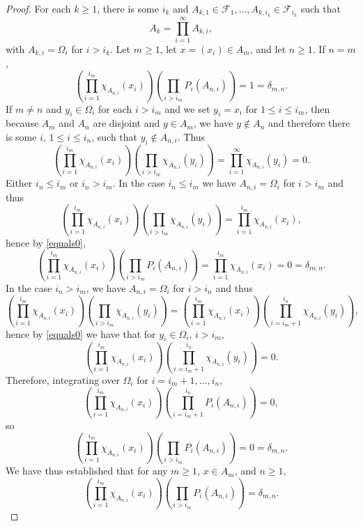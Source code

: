 \documentclass{article}
\theoremstyle{definition}
\theoremstyle{definition}
\begin{document}
\begin{proof}
For each $k \geq 1$, there is some $i_k$ and $A_{k,1} \in \mathscr{F}_1, \ldots,A_{k,i_k} \in \mathscr{F}_{i_k}$ such that
\[
A_k = \prod_{i=1}^\infty A_{k,i},
\]
with $A_{k,i}=\Omega_i$ for $i>i_k$. 
Let $m \geq 1$, let $x=(x_i) \in A_m$, and let $n \geq 1$. If $n=m$,  
\[
\left( \prod_{i=1}^{i_m} \chi_{A_{n,i}}(x_i) \right) \left( \prod_{i>i_m} P_i(A_{n,i}) \right) 
=1=\delta_{m,n}.
\]
If $m \neq n$ and $y_i \in \Omega_i$ for each $i>i_m$ and we set
$y_i=x_i$ for $1 \leq i \leq i_m$,
then  because $A_m$ and $A_n$ are disjoint and $y \in A_m$,
we have $y \not \in A_n$ and therefore there is some $i$,
$1 \leq i \leq i_n$, such that $y_i \not \in A_{n,i}$. 
Thus
\begin{equation}
\left( \prod_{i=1}^{i_m} \chi_{A_{n,i}}(x_i) \right) \left( \prod_{i>i_m} \chi_{A_{n,i}}(y_i) \right) = 
\prod_{i=1}^\infty \chi_{A_{n,i}}(y_i) = 0.
\label{equals0}
\end{equation}
Either $i_n \leq i_m$ or $i_n>i_m$. In the case $i_n \leq i_m$ we have
$A_{n,i} = \Omega_i$ for $i > i_m$ and thus
\[
\left( \prod_{i=1}^{i_m} \chi_{A_{n,i}}(x_i) \right) \left( \prod_{i>i_m} \chi_{A_{n,i}}(y_i) \right) 
= \prod_{i=1}^{i_m} \chi_{A_{n,i}}(x_i),
\]
hence by \eqref{equals0},
\[
\left( \prod_{i=1}^{i_m} \chi_{A_{n,i}}(x_i) \right)  \left( \prod_{i>i_m} P_i(A_{n,i}) \right)
=
\prod_{i=1}^{i_m} \chi_{A_{n,i}}(x_i)
 = 0 = \delta_{m,n}.
\]
In the case $i_n>i_m$, we have $A_{n,i}=\Omega_i$ for $i>i_n$ and thus
\[
\left( \prod_{i=1}^{i_m} \chi_{A_{n,i}}(x_i) \right) \left( \prod_{i>i_m} \chi_{A_{n,i}}(y_i) \right)=
\left( \prod_{i=1}^{i_m} \chi_{A_{n,i}}(x_i) \right) 
\left( \prod_{i=i_m+1}^{i_n} \chi_{A_{n,i}}(y_i) \right),
\]
hence by \eqref{equals0} we have that for $y_i \in \Omega_i$, $i > i_m$,
\[
\left( \prod_{i=1}^{i_m} \chi_{A_{n,i}}(x_i) \right) 
\left( \prod_{i=i_m+1}^{i_n} \chi_{A_{n,i}}(y_i) \right)=0.
\]
Therefore, integrating over $\Omega_i$ for $i=i_m+1,\ldots,i_n$,
\[
\left( \prod_{i=1}^{i_m} \chi_{A_{n,i}}(x_i) \right)  \left( \prod_{i=i_m+1}^{i_n} P_i(A_{n,i}) \right)
=0,
\]
so
\[
\left( \prod_{i=1}^{i_m} \chi_{A_{n,i}}(x_i) \right)  \left( \prod_{i>i_m} P_i(A_{n,i}) \right)=0=
\delta_{m,n}.
\]
We have thus established that for any $m \geq 1$, $x \in A_m$, and $n \geq 1$,
\begin{equation}
\left( \prod_{i=1}^{i_m} \chi_{A_{n,i}}(x_i) \right)  \left( \prod_{i>i_m} P_i(A_{n,i}) \right)=
\delta_{m,n}.
\label{deltamn}
\end{equation}


\end{proof}
\end{document}
